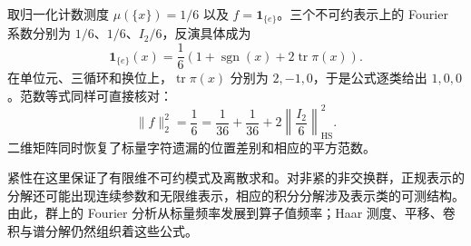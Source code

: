 取归一化计数测度 \(\mu(\{x\})=1/6\) 以及 \(f=\mathbf1_{\{e\}}\)。三个不可约表示上的 Fourier 系数分别为 \(1/6\)、\(1/6\)、\(I_2/6\)，反演具体成为
\[
 \mathbf1_{\{e\}}(x)
 =\frac16\left(1+\operatorname{sgn}(x)+2\operatorname{tr}\pi(x)\right).
\]
在单位元、三循环和换位上，\(\operatorname{tr}\pi(x)\) 分别为 \(2,-1,0\)，于是公式逐类给出 \(1,0,0\)。范数等式同样可直接核对：
\[
 \|f\|_2^2=\frac16
 =\frac1{36}+\frac1{36}+2\left\|\frac{I_2}{6}\right\|_{\mathrm{HS}}^2.
\]
二维矩阵同时恢复了标量字符遗漏的位置差别和相应的平方范数。

紧性在这里保证了有限维不可约模式及离散求和。对非紧的非交换群，正规表示的分解还可能出现连续参数和无限维表示，相应的积分分解涉及表示类的可测结构。由此，群上的 Fourier 分析从标量频率发展到算子值频率；Haar 测度、平移、卷积与谱分解仍然组织着这些公式。
